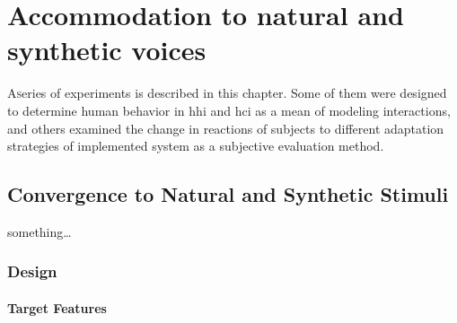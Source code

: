 \chapter{Accommodation to natural and synthetic voices}
\label{chap:accommodation_to_natural_and_synthetic_voices}

\lettrine{A} series of experiments is described in this chapter.
Some of them were designed to determine human behavior in \acl{hhi} and \ac{hci} as a mean of modeling interactions, and others examined the change in reactions of subjects to different adaptation strategies of implemented system as a subjective evaluation method.

\pagebreak

\section{Convergence to Natural and Synthetic Stimuli}
\label{sec:convergence_to_natural_and_synthetic_stimuli}

something\ldots

\subsection{Design}
\label{subsec:design_HCIConv}

\subsubsection{Target Features}
\label{subsec:target_features_HCIConv}


